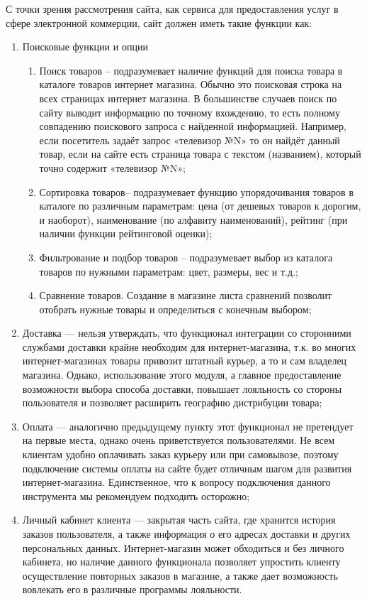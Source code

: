 С точки зрения рассмотрения сайта, как сервиса для предоставления услуг в сфере электронной коммерции, сайт должен иметь такие функции как:
\begin{enumerate}
    \item Поисковые функции и опции
    \begin{enumerate}
        \item Поиск товаров – подразумевает наличие функций для поиска товара в каталоге товаров интернет магазина.
        Обычно это поисковая строка на всех страницах интернет магазина.
        В большинстве случаев поиск по сайту выводит информацию по точному вхождению, то есть полному совпадению поискового запроса с найденной информацией.
        Например, если посетитель задаёт запрос «телевизор №N» то он найдёт данный товар, если на сайте есть страница товара с текстом (названием), который точно содержит «телевизор №N»;
        \item Сортировка товаров– подразумевает функцию упорядочивания товаров в каталоге по различным параметрам: цена (от дешевых товаров к дорогим, и наоборот), наименование (по алфавиту наименований), рейтинг (при наличии функции рейтинговой оценки);
        \item Фильтрование и подбор товаров – подразумевает выбор из каталога товаров по нужными параметрам: цвет, размеры, вес и т.д.;
        \item Сравнение товаров. Создание в магазине листа сравнений позволит отобрать нужные товары и определиться с конечным выбором;
    \end{enumerate}
    \item Доставка — нельзя утверждать, что функционал интеграции со сторонними службами доставки крайне необходим для интернет-магазина, т.к. во многих интернет-магазинах товары привозит штатный курьер, а то и сам владелец магазина.
    Однако, использование этого модуля, а главное предоставление возможности выбора способа доставки, повышает лояльность со стороны пользователя и позволяет расширить географию дистрибуции товара;
    \item Оплата — аналогично предыдущему пункту этот функционал не претендует на первые места, однако очень приветствуется пользователями.
    Не всем клиентам удобно оплачивать заказ курьеру или при самовывозе, поэтому подключение системы оплаты на сайте будет отличным шагом для развития интернет-магазина.
    Единственное, что к вопросу подключения данного инструмента мы рекомендуем подходить осторожно;
    \item Личный кабинет клиента — закрытая часть сайта, где хранится история заказов пользователя, а также информация о его адресах доставки и других персональных данных.
    Интернет-магазин может обходиться и без личного кабинета, но наличие данного функционала позволяет упростить клиенту осуществление повторных заказов в магазине, а также дает возможность вовлекать его в различные программы лояльности.
\end{enumerate}


